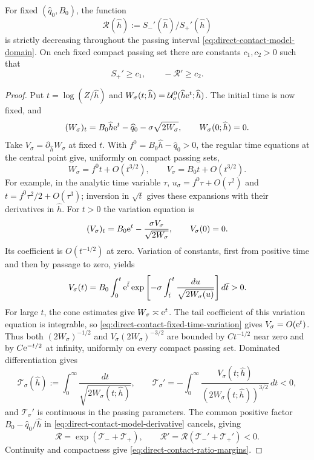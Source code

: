 \begin{samepage}
\begin{lemma}
\label{lem:direct-contact-scattering-ratio}
For fixed $(\widehat q_0,B_0)$, the function
\[
 \mathscr R(\widehat h):=S_-'(\widehat h)/S_+'(\widehat h)
\]
is strictly decreasing throughout the passing interval
\eqref{eq:direct-contact-model-domain}. On each fixed compact
passing set there are constants $c_1,c_2>0$ such that
\begin{equation}
\label{eq:direct-contact-ratio-margins}
 S_+'\ge c_1,\qquad -\mathscr R'\ge c_2.
\end{equation}
\end{lemma}
\end{samepage}

\begin{proof}
Put $t=\log(Z/\widehat h)$ and
$W_\sigma(t;\widehat h)=\mathcal U_\sigma^0(\widehat h \mathrm e^t;\widehat h)$.
The initial time is now fixed, and
\[
 (W_\sigma)_t=B_0\widehat h \mathrm e^t-\widehat q_0-\sigma\sqrt{2W_\sigma},
 \qquad W_\sigma(0;\widehat h)=0.
\]
Take $V_\sigma=\partial_{\widehat h}W_\sigma$ at fixed $t$.
With $f^0=B_0\widehat h-\widehat q_0>0$,
the regular time equations at the central point give, uniformly on compact
passing sets,
\[
 W_\sigma=f^0t+O(t^{3/2}),\qquad
 V_\sigma=B_0t+O(t^{3/2}).
\]
For example, in the analytic time variable $\tau$,
$u_\sigma=f^0\tau+O(\tau^2)$ and
$t=f^0\tau^2/2+O(\tau^3)$; inversion in $\sqrt t$ gives these
expansions with their derivatives in $\widehat h$.
For $t>0$ the variation equation is
\[
 (V_\sigma)_t=B_0\mathrm e^t-\frac{\sigma V_\sigma}{\sqrt{2W_\sigma}},
 \qquad V_\sigma(0)=0.
\]
Its coefficient is $O(t^{-1/2})$ at zero. Variation of constants,
first from positive time and then by passage to zero, yields
\begin{equation}
\label{eq:direct-contact-fixed-time-variation}
 V_\sigma(t)=B_0\int_0^t \mathrm e^{\bar t}
 \exp\left[-\sigma\int_{\bar t}^t\frac{du}{\sqrt{2W_\sigma(u)}}\right]d\bar t>0.
\end{equation}
For large $t$, the cone estimates give $W_\sigma\asymp \mathrm e^t$.
The tail coefficient of this variation equation is integrable,
so \eqref{eq:direct-contact-fixed-time-variation} gives
$V_\sigma=O(\mathrm e^t)$. Thus both
$(2W_\sigma)^{-1/2}$ and
$V_\sigma(2W_\sigma)^{-3/2}$ are bounded by
$Ct^{-1/2}$ near zero and by $C\mathrm e^{-t/2}$ at infinity,
uniformly on every compact passing set. Dominated differentiation gives
\[
 \mathcal T_\sigma(\widehat h):=\int_0^\infty
            \frac{dt}{\sqrt{2W_\sigma(t;\widehat h)}},\qquad
 \mathcal T_\sigma'=-\int_0^\infty
       \frac{V_\sigma(t;\widehat h)}{(2W_\sigma(t;\widehat h))^{3/2}}\,dt<0,
\]
and $\mathcal T_\sigma'$ is continuous in the passing parameters.
The common positive factor $B_0-\widehat q_0/\widehat h$ in
\eqref{eq:direct-contact-model-derivative} cancels, giving
\[
 \mathscr R=\exp(\mathcal T_-+\mathcal T_+),\qquad
 \mathscr R'=\mathscr R(\mathcal T_-'+\mathcal T_+')<0.
\]
Continuity and compactness give \eqref{eq:direct-contact-ratio-margins}.
\end{proof}


